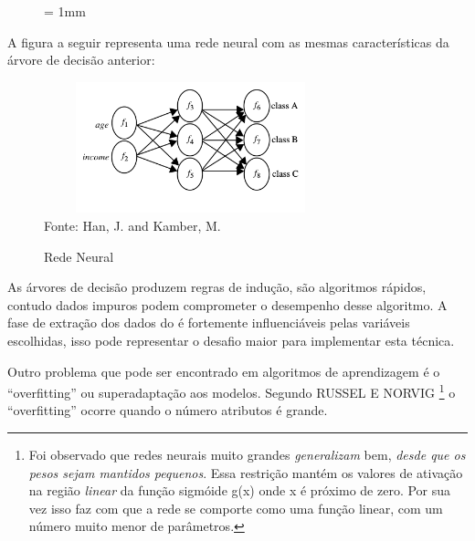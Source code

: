 \vspace{2cm}

\begin{figure}[ht] \unitlength= 1mm \thicklines
\end{figure}

\vspace{3cm} 

A figura a seguir representa uma rede neural com as mesmas características da árvore de decisão anterior:
\begin{figure}[!ht]
	\centering
	\caption{Rede Neural}
	\includegraphics[width=85mm, height=38mm]{Figuras/BigData/redeneural.png}\\
	\tiny Fonte: Han, J. and Kamber, M. 
\end{figure}  

As árvores de decisão produzem regras de indução, são algoritmos rápidos, contudo dados impuros podem comprometer o desempenho desse algoritmo. 
A fase de extração dos dados do é fortemente influenciáveis pelas variáveis escolhidas, \cite{DecisionTree} 
isso pode representar o desafio maior para implementar esta técnica. 

Outro problema que pode ser encontrado em algoritmos de aprendizagem é o ``overfitting'' ou superadaptação aos modelos.
Segundo RUSSEL E NORVIG \cite{NorvigRussel2004}  \footnote{Foi observado que redes neurais muito grandes \textit{generalizam} bem, 
\textit{desde que os pesos sejam mantidos pequenos}. Essa restrição mantém os valores de ativação na região 
\textit{linear} da função sigmóide g(x) onde x é próximo de zero. Por sua vez isso faz com que a rede se comporte 
como uma função linear, com um número muito menor de parâmetros.} o ``overfitting'' ocorre quando o número atributos é grande.

